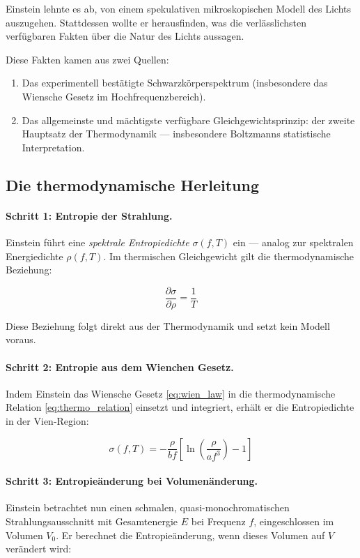 Einstein lehnte es ab, von einem spekulativen mikroskopischen Modell des Lichts 
auszugehen. Stattdessen wollte er herausfinden, was die verlässlichsten verfügbaren 
Fakten über die Natur des Lichts aussagen.

Diese Fakten kamen aus zwei Quellen:
\begin{enumerate}
    \item Das experimentell bestätigte Schwarzkörperspektrum (insbesondere das Wiensche 
    Gesetz im Hochfrequenzbereich).
    \item Das allgemeinste und mächtigste verfügbare Gleichgewichtsprinzip: der zweite 
    Hauptsatz der Thermodynamik — insbesondere Boltzmanns statistische Interpretation.
\end{enumerate}

\subsection{Die thermodynamische Herleitung}

\paragraph{Schritt 1: Entropie der Strahlung.}
Einstein führt eine \emph{spektrale Entropiedichte} $\sigma(f, T)$ ein — analog zur 
spektralen Energiedichte $\rho(f, T)$. Im thermischen Gleichgewicht gilt die 
thermodynamische Beziehung:

\begin{equation}
    \frac{\partial \sigma}{\partial \rho} = \frac{1}{T}
    \label{eq:thermo_relation}
\end{equation}

Diese Beziehung folgt direkt aus der Thermodynamik und setzt kein Modell voraus.

\paragraph{Schritt 2: Entropie aus dem Wienchen Gesetz.}
Indem Einstein das Wiensche Gesetz \eqref{eq:wien_law} in die thermodynamische 
Relation \eqref{eq:thermo_relation} einsetzt und integriert, erhält er die 
Entropiedichte in der Vien-Region:

\begin{equation}
    \sigma(f, T) = -\frac{\rho}{bf} \left[\ln\!\left(\frac{\rho}{af^3}\right) - 1\right]
    \label{eq:entropy_density}
\end{equation}

\paragraph{Schritt 3: Entropieänderung bei Volumenänderung.}
Einstein betrachtet nun einen schmalen, quasi-monochromatischen Strahlungsausschnitt 
mit Gesamtenergie $E$ bei Frequenz $f$, eingeschlossen im Volumen $V_0$. Er berechnet 
die Entropieänderung, wenn dieses Volumen auf $V$ verändert wird:


